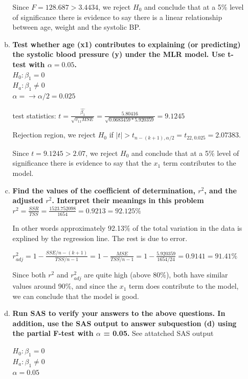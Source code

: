 \documentclass{article}
\begin{document}
\begin{enumerate}[1.]
\begin{enumerate}[(a)]
Since $F = 128.687 > 3.4434$, we reject $H_0$ and conclude that at a 5\% level of significance there is evidence to say there is a linear relationship between age, weight and the systolic BP.

\item \textbf{ Test whether age (x1) contributes to explaining (or predicting) the systolic blood pressure (y) under the MLR model. Use t-test with $\alpha = 0.05$. } \\

$H_0: \beta_1 = 0$ \\
$H_a: \beta_1 \neq 0$ \\
$\alpha = \to \alpha/2 =  0.025$

test statistics: $t = \frac{\hat{\beta_1}}{\sqrt{v_{11}MSE}} = \frac{5.80416}{\sqrt{0.0683459 * 5.920359}} = 9.1245$

Rejection region, we reject $H_0$ if $|t| > t_{n-(k+1), \alpha/2} = t_{22, 0.025} =  2.07383$.

Since $t =  9.1245 > 2.07$, we reject $H_0$ and conclude that at a 5\% level of significance there is evidence to say that the $x_1$ term contributes to the model.

\item \textbf{ Find the values of the coefficient of determination, $r^2$, and the adjusted $r^2$. Interpret their meanings in this problem} \\

$r^2 = \frac{SSR}{TSS} = \frac{1523.752098}{1654} = 0.9213 = 92.125\%$

In other words approximately 92.13\% of the total variation in the data is explined by the regression line. The rest is due to error.

$r_{adj}^2 = 1 - \frac{SSE/n-(k+1)}{TSS/n-1} = 1 - \frac{MSE}{TSS/n-1} = 1 - \frac{5.920359}{1654/24} = 0.9141 = 91.41\%$

Since both $r^2$ and $r_{adj}^2$ are quite high (above 80\%), both have similar values around 90\%, and since the $x_1$ term does contribute to the model, we can conclude that the model is good.

\item \textbf{ Run SAS to verify your answers to the above questions. In addition, use the SAS output to answer subquestion (d) using the partial F-test with $\alpha$ = 0.05.} See attatched SAS output

$H_0: \beta_1 = 0$ \\
$H_a: \beta_1 \neq 0$ \\
$\alpha = 0.05$ \\


\end{enumerate}
\end{enumerate}
\end{document}
